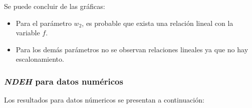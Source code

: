 \begin{figure}[H]
  \centering
  \label{fig:f_de1}
\end{figure}

    Se puede concluir de las gráficas:
\begin{itemize}
    \item Para el parámetro $w_2$, es probable que exista una
relación lineal con la variable $f$.
    \item Para los demás parámetros no se observan relaciones
lineales ya que no hay escalonamiento.
\end{itemize}

\subsubsection{\emph{NDEH} para datos numéricos}

    Los resultados para datos númericos se presentan a continuación:

